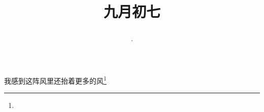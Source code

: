 \title{\date[d=9,m=10,y=2024][year:cn-y,年,month:cn,day:cn,日,·,weekday]·九月初七 }
我感到这阵风里还抬着更多的风\footnote{ }


